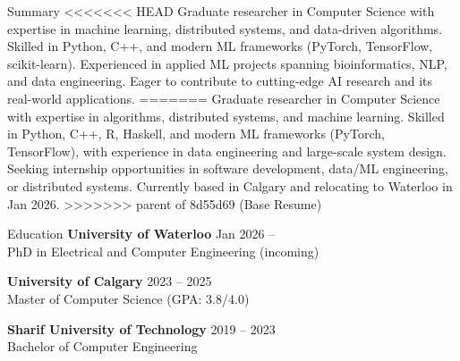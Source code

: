 \documentclass{resume}
\begin{document}
\begin{rSection}{Summary}
<<<<<<< HEAD
Graduate researcher in Computer Science with expertise in machine learning, distributed systems, and data-driven algorithms. Skilled in Python, C++, and modern ML frameworks (PyTorch, TensorFlow, scikit-learn). Experienced in applied ML projects spanning bioinformatics, NLP, and data engineering. Eager to contribute to cutting-edge AI research and its real-world applications.
=======
Graduate researcher in Computer Science with expertise in algorithms, distributed 
systems, and machine learning. Skilled in Python, C++, R, Haskell, and modern ML frameworks 
(PyTorch, TensorFlow), with experience in data engineering and large-scale system 
design. Seeking internship opportunities in software development, data/ML engineering, 
or distributed systems. Currently based in Calgary and relocating to Waterloo in Jan 2026.
>>>>>>> parent of 8d55d69 (Base Resume)
\end{rSection}


\begin{rSection}{Education}
{\bf University of Waterloo} \hfill Jan 2026 -- \\
PhD in Electrical and Computer Engineering (incoming)

{\bf University of Calgary} \hfill 2023 -- 2025 \\
Master of Computer Science (GPA: 3.8/4.0)

{\bf Sharif University of Technology} \hfill 2019 -- 2023 \\
Bachelor of Computer Engineering
\end{rSection}

\end{document}
